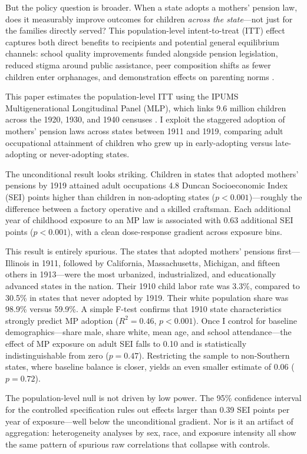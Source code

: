\documentclass[12pt]{article}
\begin{document}
But the policy question is broader. When a state adopts a mothers' pension law, does it measurably improve outcomes for children \emph{across the state}---not just for the families directly served? This population-level intent-to-treat (ITT) effect captures both direct benefits to recipients and potential general equilibrium channels: school quality improvements funded alongside pension legislation, reduced stigma around public assistance, peer composition shifts as fewer children enter orphanages, and demonstration effects on parenting norms \citep{moehling2007}.

This paper estimates the population-level ITT using the IPUMS Multigenerational Longitudinal Panel (MLP), which links 9.6 million children across the 1920, 1930, and 1940 censuses \citep{ruggles2021, abramitzky2021}. I exploit the staggered adoption of mothers' pension laws across states between 1911 and 1919, comparing adult occupational attainment of children who grew up in early-adopting versus late-adopting or never-adopting states.

The unconditional result looks striking. Children in states that adopted mothers' pensions by 1919 attained adult occupations 4.8 Duncan Socioeconomic Index (SEI) points higher than children in non-adopting states ($p < 0.001$)---roughly the difference between a factory operative and a skilled craftsman. Each additional year of childhood exposure to an MP law is associated with 0.63 additional SEI points ($p < 0.001$), with a clean dose-response gradient across exposure bins.

This result is entirely spurious. The states that adopted mothers' pensions first---Illinois in 1911, followed by California, Massachusetts, Michigan, and fifteen others in 1913---were the most urbanized, industrialized, and educationally advanced states in the nation. Their 1910 child labor rate was 3.3\%, compared to 30.5\% in states that never adopted by 1919. Their white population share was 98.9\% versus 59.9\%. A simple F-test confirms that 1910 state characteristics strongly predict MP adoption ($R^2 = 0.46$, $p < 0.001$). Once I control for baseline demographics---share male, share white, mean age, and school attendance---the effect of MP exposure on adult SEI falls to 0.10 and is statistically indistinguishable from zero ($p = 0.47$). Restricting the sample to non-Southern states, where baseline balance is closer, yields an even smaller estimate of 0.06 ($p = 0.72$).

The population-level null is not driven by low power. The 95\% confidence interval for the controlled specification rules out effects larger than 0.39 SEI points per year of exposure---well below the unconditional gradient. Nor is it an artifact of aggregation: heterogeneity analyses by sex, race, and exposure intensity all show the same pattern of spurious raw correlations that collapse with controls.
\end{document}
